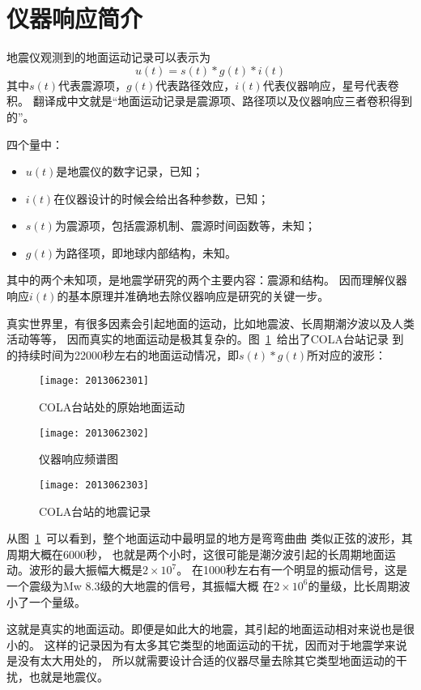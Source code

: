 \section{仪器响应简介}
地震仪观测到的地面运动记录可以表示为
\[  u(t) = s(t) * g(t) * i(t) \]
其中$s(t)$代表震源项，$g(t)$代表路径效应，$i(t)$代表仪器响应，星号代表卷积。
翻译成中文就是“地面运动记录是震源项、路径项以及仪器响应三者卷积得到的”。

四个量中：
\begin{itemize}
\item $u(t)$是地震仪的数字记录，已知；
\item $i(t)$在仪器设计的时候会给出各种参数，已知；
\item $s(t)$为震源项，包括震源机制、震源时间函数等，未知；
\item $g(t)$为路径项，即地球内部结构，未知。
\end{itemize}
其中的两个未知项，是地震学研究的两个主要内容：震源和结构。
因而理解仪器响应$i(t)$的基本原理并准确地去除仪器响应是研究的关键一步。

真实世界里，有很多因素会引起地面的运动，比如地震波、长周期潮汐波以及人类活动等等，
因而真实的地面运动是极其复杂的。图~\ref{fig:ground-motion}~给出了COLA台站记录
到的持续时间为22000秒左右的地面运动情况，即$s(t)*g(t)$所对应的波形：

\begin{figure}[H]
\centering
\texttt{[image: 2013062301]}
\caption{COLA台站处的原始地面运动}
\label{fig:ground-motion}
\end{figure}

\begin{figure}[H]
\centering
\texttt{[image: 2013062302]}
\caption{仪器响应频谱图}
\label{fig:transfer-function}
\end{figure}

\begin{figure}[H]
\centering
\texttt{[image: 2013062303]}
\caption{COLA台站的地震记录}
\end{figure}

从图~\ref{fig:ground-motion}~可以看到，整个地面运动中最明显的地方是弯弯曲曲
类似正弦的波形，其周期大概在6000秒，
也就是两个小时，这很可能是潮汐波引起的长周期地面运动。波形的最大振幅大概是$2\times10^7$。
在1000秒左右有一个明显的振动信号，这是一个震级为Mw 8.3级的大地震的信号，其振幅大概
在$2\times10^6$的量级，比长周期波小了一个量级。

这就是真实的地面运动。即便是如此大的地震，其引起的地面运动相对来说也是很小的。
这样的记录因为有太多其它类型的地面运动的干扰，因而对于地震学来说是没有太大用处的，
所以就需要设计合适的仪器尽量去除其它类型地面运动的干扰，也就是地震仪。

